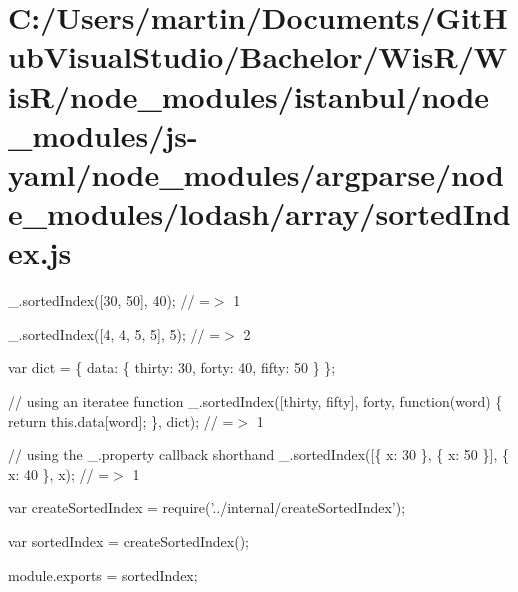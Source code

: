 \hypertarget{_c_1_2_users_2martin_2_documents_2_git_hub_visual_studio_2_bachelor_2_wis_r_2_wis_r_2node_module52061ce0f65a6be4b1a27019a989efcb}{}\section{C\+:/\+Users/martin/\+Documents/\+Git\+Hub\+Visual\+Studio/\+Bachelor/\+Wis\+R/\+Wis\+R/node\+\_\+modules/istanbul/node\+\_\+modules/js-\/yaml/node\+\_\+modules/argparse/node\+\_\+modules/lodash/array/sorted\+Index.\+js}
\+\_\+.\+sorted\+Index(\mbox{[}30, 50\mbox{]}, 40); // =$>$ 1

\+\_\+.\+sorted\+Index(\mbox{[}4, 4, 5, 5\mbox{]}, 5); // =$>$ 2

var dict = \{ \textquotesingle{}data\textquotesingle{}\+: \{ \textquotesingle{}thirty\textquotesingle{}\+: 30, \textquotesingle{}forty\textquotesingle{}\+: 40, \textquotesingle{}fifty\textquotesingle{}\+: 50 \} \};

// using an iteratee function \+\_\+.\+sorted\+Index(\mbox{[}\textquotesingle{}thirty\textquotesingle{}, \textquotesingle{}fifty\textquotesingle{}\mbox{]}, \textquotesingle{}forty\textquotesingle{}, function(word) \{ return this.\+data\mbox{[}word\mbox{]}; \}, dict); // =$>$ 1

// using the {\ttfamily \+\_\+.\+property} callback shorthand \+\_\+.\+sorted\+Index(\mbox{[}\{ \textquotesingle{}x\textquotesingle{}\+: 30 \}, \{ \textquotesingle{}x\textquotesingle{}\+: 50 \}\mbox{]}, \{ \textquotesingle{}x\textquotesingle{}\+: 40 \}, \textquotesingle{}x\textquotesingle{}); // =$>$ 1


\begin{DoxyCodeInclude}
var createSortedIndex = require(\textcolor{stringliteral}{'../internal/createSortedIndex'});

var sortedIndex = createSortedIndex();

module.exports = sortedIndex;
\end{DoxyCodeInclude}
 
